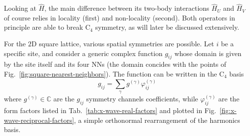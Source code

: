 Looking at $\hat H$, the main difference between its two-body interactions $\hat H_U$ and $\hat H_V$ of course relies in locality (first) and non-locality (second). Both operators in principle are able to break $\mathrm{C}_4$ symmetry, as will later be discussed extensively.

For the $2$D square lattice, various spatial symmetries are possible. Let $i$ be a specific site, and consider a generic complex function $g_{ij}$ whose domain is given by the site itself and its four NNs (the domain concides with the points of Fig.~\ref{fig:square-nearest-neighbors}). The function can be written in the $\mathrm{C}_4$ basis
\[
	g_{ij} = \sum_\gamma g^{(\gamma)} \varphi_{ij}^{(\gamma)}
\]
where $g^{(\gamma)} \in \mathbb{C}$ are the $g_{ij}$ symmetry channels coefficients, while $\varphi_{ij}^{(\gamma)}$ are the form factors listed in Tab.~\ref{tab:x-wave-real-factors} and plotted in Fig.~\ref{fig:x-wave-reciprocal-factors}, a simple orthonormal rearrangement of the harmonics basis.

